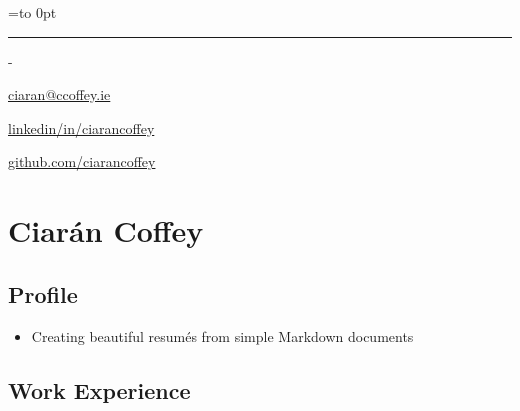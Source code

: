 \documentclass[]{article}
\date{}
\newenvironment{nospace}
  {\par\edef\theprevdepth{\the\prevdepth}\nointerlineskip
   \setbox\zerobox=\vtop to 0pt\bgroup
   \hrule height0pt\kern\dimexpr\baselineskip-\topskip\relax
  }
  {\par\vss\egroup\ht\zerobox=0pt \wd\zerobox=0pt \dp\zerobox=0pt
   \box\zerobox}
\begin{document}
\begin{nospace}\begin{flushright}
\vspace{-2em}\href{mailto:ciaran@ccoffey.ie}{ciaran@ccoffey.ie}

\href{http://linkedin.com/in/ciarancoffey}{linkedin/in/ciarancoffey}

\href{http://github.com/ciarancoffey}{github.com/ciarancoffey}
\end{flushright}\end{nospace}

\section{Ciarán Coffey}\label{ciaruxe1n-coffey}

\subsection{Profile}\label{profile}

\begin{itemize}
\itemsep1pt\parskip0pt
\item
  Creating beautiful resumés from simple Markdown documents
\end{itemize}

\subsection{Work Experience}\label{work-experience}
\end{document}
